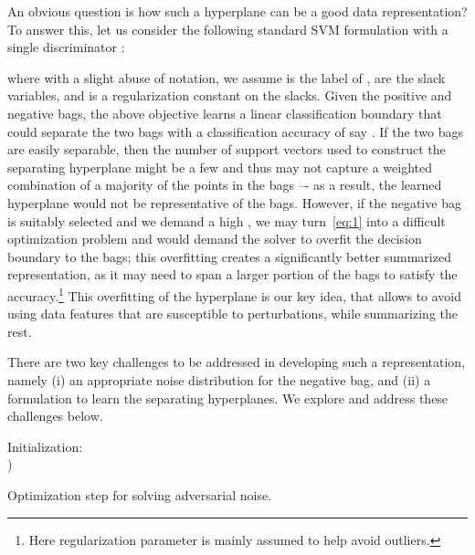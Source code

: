 \documentclass[runningheads]{llncs}
\begin{document}
An obvious question is how such a hyperplane can be a good data representation? To answer this, let us consider the following standard SVM formulation with a single discriminator :

where with a slight abuse of notation, we assume  is the label of ,  are the slack variables, and  is a regularization constant on the slacks. Given the positive and negative bags, the above objective learns a linear classification boundary that could separate the two bags with a classification accuracy of say . If the two bags are easily separable, then the number of support vectors used to construct the separating hyperplane might be a few and thus may not capture a weighted combination of a majority of the points in the bags –- as a result, the learned hyperplane would not be representative of the bags. However, if the negative bag  is suitably selected and we demand a high , we may turn~\eqref{eq:1} into a difficult optimization problem and would demand the solver to overfit the decision boundary to the bags; this overfitting creates a significantly better summarized representation, as it may need to span a larger portion of the bags to satisfy the  accuracy.\footnote{Here regularization parameter  is mainly assumed to help avoid outliers.} This overfitting of the hyperplane is our key idea, that allows to avoid using data features that are susceptible to perturbations, while summarizing the rest.

There are two key challenges to be addressed in developing such a representation, namely (i) an appropriate noise distribution for the negative bag, and (ii) a formulation to learn the separating hyperplanes. We explore and address these challenges below.
\begin{algorithm} [t]
	\SetAlgoLined
	Initialization:  \\
	\Repeat{} {
		\;
		)\;
	}
	\KwRet{}
	\caption{Optimization step for solving adversarial noise.}
	\label{alg:1}
\end{algorithm}
\end{document}
